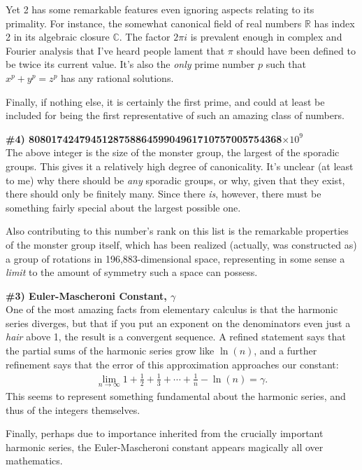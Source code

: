 \documentclass[12pt]{article}
\newcommand{\ra}{\rightarrow}
\newcommand{\<}{\langle}
\renewcommand{\>}{\rangle}
\begin{document}
Yet 2 has some remarkable features even ignoring aspects relating to
its primality.  For instance, the somewhat canonical
field of real numbers $\mathbb{R}$ has index 2 in its algebraic
closure $\mathbb{C}$.  The factor $2\pi i$ is prevalent enough in
complex and Fourier analysis that I've heard people lament that $\pi$
should have been defined to be twice its current value.  It's also the \emph{only} prime number $p$ such that $x^p+y^p=z^p$ has any rational solutions.

Finally, if nothing else, it is certainly the first prime, and could
at least be included for being the first representative of such an
amazing class of numbers.

\textbf{{\Large \#4)  808017424794512875886459904961710757005754368$\times 10^9$}}\\

The above integer is the size of the monster group, the largest
of the sporadic groups.  This gives it a relatively high degree of
canonicality.  It's unclear (at least to me) why there should be
\emph{any} sporadic groups, or why, given that they exist, there
should only be finitely many.  Since there \emph{is}, however, there
must be something fairly special about the largest possible one.

Also contributing to this number's rank on this list is the remarkable
properties of the monster group itself, which has been realized
(actually, was constructed as) a group of rotations in
196,883-dimensional space, representing in some sense a \emph{limit}
to the amount of symmetry such a space can possess.

\textbf{{\Large \#3) Euler-Mascheroni Constant, $\gamma$}}\\ One of
the most amazing facts from elementary calculus is that the harmonic
series diverges, but that if you put an exponent on the denominators
even just a \emph{hair} above 1, the result is a convergent sequence.
A refined statement says that the partial sums of the harmonic series
grow like $\ln(n)$, and a further refinement says that the error of
this approximation approaches our constant:
\begin{align*}
\lim\limits_{n\ra\infty}1+\frac{1}{2}+\frac{1}{3}+\cdots+\frac{1}{n}-\ln(n)=\gamma.
\end{align*}
This seems to represent something fundamental about the harmonic series, and
thus of the integers themselves.  

Finally, perhaps due to importance inherited from the crucially
important harmonic series, the Euler-Mascheroni constant appears
magically all over mathematics.  
\end{document}

